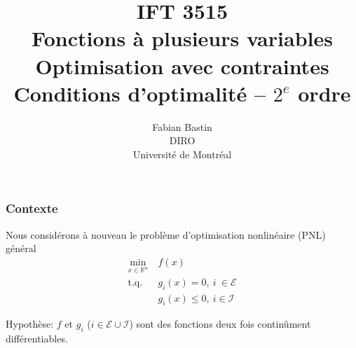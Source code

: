 \documentclass[usepdftitle=false,aspectratio=169]{beamer}
\title[IFT3515]{IFT 3515\\Fonctions à plusieurs variables\\Optimisation avec contraintes\\Conditions d'optimalité -- $2^e$ ordre}
\author[Fabian Bastin]{Fabian Bastin\\DIRO\\Université de Montréal}
\date{}
\def\cE{\mathcal{E}}
\def\cI{\mathcal{I}}
\def\RR{\mathbb{R}}
\begin{document}
\frame{\titlepage}


\begin{frame}
\frametitle{Contexte}



Nous considérons à nouveau le problème d'optimisation nonlinéaire (PNL) général
\begin{align*}
\min_{x \in \RR^n}\ & f(x) \\
\mbox{t.q. } & g_i(x) = 0,\ i\ \in \cE \\
& g_i(x) \leq 0,\ i \in \cI
\end{align*}

Hypothèse: $f$ et $g_i$ ($i \in \cE \cup \cI$) sont des fonctions deux fois continûment différentiables.

\end{frame}
\end{document}
